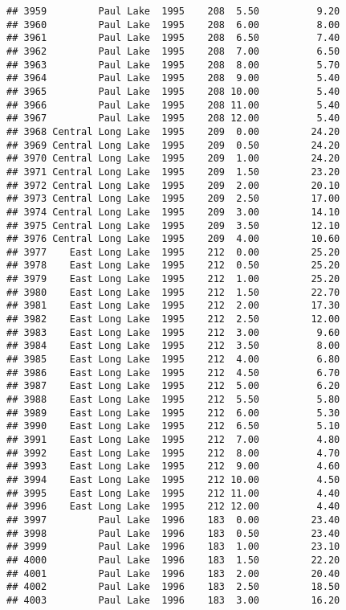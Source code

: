 \documentclass[
]{article}
\begin{document}
\begin{verbatim}
## 3959         Paul Lake  1995    208  5.50          9.20
## 3960         Paul Lake  1995    208  6.00          8.00
## 3961         Paul Lake  1995    208  6.50          7.40
## 3962         Paul Lake  1995    208  7.00          6.50
## 3963         Paul Lake  1995    208  8.00          5.70
## 3964         Paul Lake  1995    208  9.00          5.40
## 3965         Paul Lake  1995    208 10.00          5.40
## 3966         Paul Lake  1995    208 11.00          5.40
## 3967         Paul Lake  1995    208 12.00          5.40
## 3968 Central Long Lake  1995    209  0.00         24.20
## 3969 Central Long Lake  1995    209  0.50         24.20
## 3970 Central Long Lake  1995    209  1.00         24.20
## 3971 Central Long Lake  1995    209  1.50         23.20
## 3972 Central Long Lake  1995    209  2.00         20.10
## 3973 Central Long Lake  1995    209  2.50         17.00
## 3974 Central Long Lake  1995    209  3.00         14.10
## 3975 Central Long Lake  1995    209  3.50         12.10
## 3976 Central Long Lake  1995    209  4.00         10.60
## 3977    East Long Lake  1995    212  0.00         25.20
## 3978    East Long Lake  1995    212  0.50         25.20
## 3979    East Long Lake  1995    212  1.00         25.20
## 3980    East Long Lake  1995    212  1.50         22.70
## 3981    East Long Lake  1995    212  2.00         17.30
## 3982    East Long Lake  1995    212  2.50         12.00
## 3983    East Long Lake  1995    212  3.00          9.60
## 3984    East Long Lake  1995    212  3.50          8.00
## 3985    East Long Lake  1995    212  4.00          6.80
## 3986    East Long Lake  1995    212  4.50          6.70
## 3987    East Long Lake  1995    212  5.00          6.20
## 3988    East Long Lake  1995    212  5.50          5.80
## 3989    East Long Lake  1995    212  6.00          5.30
## 3990    East Long Lake  1995    212  6.50          5.10
## 3991    East Long Lake  1995    212  7.00          4.80
## 3992    East Long Lake  1995    212  8.00          4.70
## 3993    East Long Lake  1995    212  9.00          4.60
## 3994    East Long Lake  1995    212 10.00          4.50
## 3995    East Long Lake  1995    212 11.00          4.40
## 3996    East Long Lake  1995    212 12.00          4.40
## 3997         Paul Lake  1996    183  0.00         23.40
## 3998         Paul Lake  1996    183  0.50         23.40
## 3999         Paul Lake  1996    183  1.00         23.10
## 4000         Paul Lake  1996    183  1.50         22.20
## 4001         Paul Lake  1996    183  2.00         20.40
## 4002         Paul Lake  1996    183  2.50         18.50
## 4003         Paul Lake  1996    183  3.00         16.20

\end{verbatim}
\end{document}
